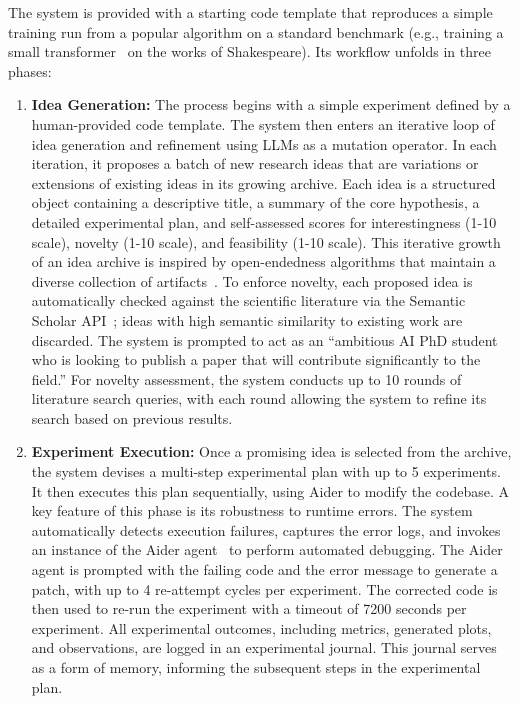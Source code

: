 The system is provided with a starting code template that reproduces a simple training run from a popular algorithm on a standard benchmark (e.g., training a small transformer~\citep{vaswani2017attention} on the works of Shakespeare). Its workflow unfolds in three phases:
\begin{enumerate}
    \item \textbf{Idea Generation:} The process begins with a simple experiment defined by a human-provided code template. The system then enters an iterative loop of idea generation and refinement using LLMs as a mutation operator. In each iteration, it proposes a batch of new research ideas that are variations or extensions of existing ideas in its growing archive. Each idea is a structured object containing a descriptive title, a summary of the core hypothesis, a detailed experimental plan, and self-assessed scores for interestingness (1-10 scale), novelty (1-10 scale), and feasibility (1-10 scale). This iterative growth of an idea archive is inspired by open-endedness algorithms that maintain a diverse collection of artifacts~\citep{stanley2017open, lehman2022evolutionlargemodels}. To enforce novelty, each proposed idea is automatically checked against the scientific literature via the Semantic Scholar API~\citep{fricke2018semantic}; ideas with high semantic similarity to existing work are discarded. The system is prompted to act as an ``ambitious AI PhD student who is looking to publish a paper that will contribute significantly to the field.'' For novelty assessment, the system conducts up to 10 rounds of literature search queries, with each round allowing the system to refine its search based on previous results.

    \item \textbf{Experiment Execution:} Once a promising idea is selected from the archive, the system devises a multi-step experimental plan with up to 5 experiments. It then executes this plan sequentially, using Aider to modify the codebase. A key feature of this phase is its robustness to runtime errors. The system automatically detects execution failures, captures the error logs, and invokes an instance of the Aider agent~\citep{aider} to perform automated debugging. The Aider agent is prompted with the failing code and the error message to generate a patch, with up to 4 re-attempt cycles per experiment. The corrected code is then used to re-run the experiment with a timeout of 7200 seconds per experiment. All experimental outcomes, including metrics, generated plots, and observations, are logged in an experimental journal. This journal serves as a form of memory, informing the subsequent steps in the experimental plan.


\end{enumerate}
